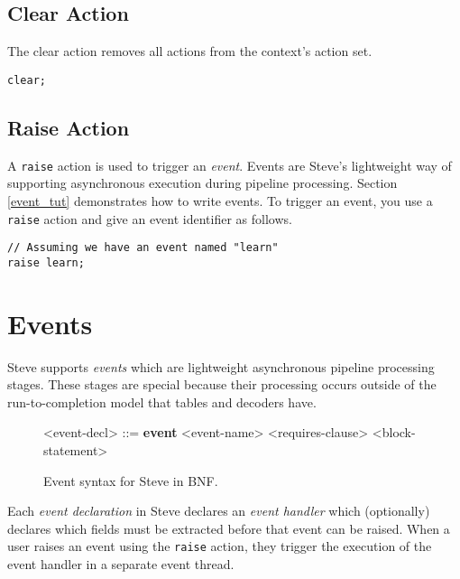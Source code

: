 \subsection{Clear Action} \label{tut:clear_action}

The clear action removes all actions from the context's action set.

\begin{lstlisting}
clear;
\end{lstlisting}

\subsection{Raise Action} \label{tut:raise_action}

A \texttt{raise} action is used to trigger an \textit{event}. Events are Steve's lightweight way of supporting asynchronous execution during pipeline processing. Section \ref{event_tut} demonstrates how to write events. To trigger an event, you use a \texttt{raise} action and give an event identifier as follows.

\begin{lstlisting}
// Assuming we have an event named "learn"
raise learn;
\end{lstlisting}

\section{Events} \label{tut:event}

Steve supports \textit{events} which are lightweight asynchronous pipeline processing stages. These stages are special because their processing occurs outside of the run-to-completion model that tables and decoders have. 

\begin{figure}[ht]
\begin{mdframed}
\begin{grammar}

<event-decl> ::=
\textbf{event} <event-name> <requires-clause> 
<block-statement>

\end{grammar}
\end{mdframed}
\caption{Event syntax for Steve in BNF.}
\label{fg:event_syntax}
\end{figure}

Each \textit{event declaration} in Steve declares an \textit{event handler} which (optionally) declares which fields must be extracted before that event can be raised. When a user raises an event using the \texttt{raise} action, they trigger the execution of the event handler in a separate event thread.

